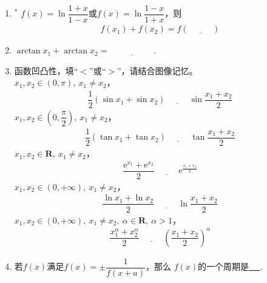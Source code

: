 \documentclass{article}
\newif\ifte
\newcommand{\e}{\mathrm{e}}
\begin{document}
\begin{multicols}{2}
\begin{enumerate}[leftmargin=20pt]
\item $^*$ $ f(x)=\ln \dfrac{1+x}{1-x} $或$ f(x)=\ln \dfrac{1-x}{1+x} $，则
\begin{gather*}
    f(x_1)+f(x_2)=f\left(\underline{\ \ifte \dfrac{x_1+x_2}{1+x_1x_2}
        \else \hspace{1cm} \fi\ } \right)
\end{gather*}

\item $ \arctan x_1+\arctan x_2=\underline{\ \ifte 
  \arctan\dfrac{x_1+x_2}{1-x_1x_2} \else \hspace{2cm} \fi\ } $.

\item 函数凹凸性，填“$ < $”或“$ > $”，请结合图像记忆。\\
$ x_1,x_2\in (0,\pi),\ x_1\neq x_2 $，
\begin{align*}
    \dfrac{1}{2} \left(\sin x_1 + \sin x_2 \right) 
    \underline{\ \ifte < \else \hspace{1cm} \fi\ }
    \sin \dfrac{x_1+x_2}{2}
\end{align*}
$ x_1,x_2\in (0,\dfrac{\pi}{2}),\ x_1\neq x_2 $，
\begin{align*}
    \dfrac{1}{2}\left(\tan x_1+\tan x_2\right)
    \underline{\ \ifte > \else \hspace{1cm} \fi\ }
    \tan\dfrac{x_1+x_2}{2}
\end{align*}
$ x_1,x_2\in \textbf{R},\ x_1\neq x_2 $，
\begin{align*}
    \dfrac{\e^{x_1}+\e^{x_2}}{2}
    \underline{\ \ifte > \else \hspace{1cm} \fi\ }
    \e^{\frac{x_1+x_2}{2}}
\end{align*}
$ x_1,x_2\in (0,+\infty),\ x_1\neq x_2 $，
\begin{align*}
    \dfrac{\ln x_1+\ln x_2}{2}
    \underline{\ \ifte < \else \hspace{1cm} \fi\ }
    \ln\dfrac{x_1+x_2}{2}
\end{align*}
$ x_1,x_2\in (0,+\infty),\ x_1\neq x_2,
\ \alpha\in \textbf{R},\ \alpha>1 $，
\begin{gather*}
    \dfrac{x_1^{\alpha}+x_2^{\alpha}}{2}
    \underline{\ \ifte > \else \hspace{1cm} \fi\ }
    \left( \dfrac{x_1+x_2}{2}\right)^{\alpha}
\end{gather*}

\item 若$ f(x) $满足$ f(x)=\pm\dfrac{1}{f(x+a)} $，那么
$ f(x) $的一个周期是\underline{\ \ifte $ 2a $ \else \hspace{1cm} \fi\ }.


\end{enumerate}
\end{multicols}
\end{document}
